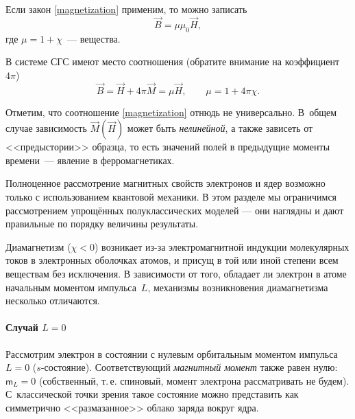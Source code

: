 Если закон \eqref{magnetization} применим,
то можно записать
\begin{equation}
    \vec{B} = \mu\mu_0 \vec{H},
\end{equation}
где $\mu = 1 + \chi$~---  вещества.
\begin{lab:note}
В системе СГС имеют место соотношения (обратите внимание на коэффициент
$4\pi$)
\[
\vec{B}=\vec{H}+4\pi\vec{M}=\mu\vec{H},\qquad \mu = 1 + 4\pi \chi.
\]
\end{lab:note}

Отметим, что соотношение \eqref{magnetization} отнюдь не универсально. 
В~общем случае зависимость $\vec{M}(\vec{H})$ может быть \emph{нелинейной}, 
а также зависеть от <<предыстории>> образца, то есть
значений полей в предыдущие моменты времени~---
явление  в ферромагнетиках.


Полноценное рассмотрение магнитных свойств электронов и ядер
возможно только с использованием квантовой механики. 
В этом разделе мы ограничимся рассмотрением
упрощённых полуклассических моделей --- они
наглядны и дают правильные по порядку величины результаты.

\label{sec:diamagnetism}

Диамагнетизм ($\chi <0$) возникает из-за электромагнитной индукции 
молекулярных токов в электронных оболочках атомов,
и присущ в той или иной степени всем веществам без исключения.
В зависимости от того, обладает ли электрон в атоме начальным моментом
импульса~$L$, механизмы возникновения диамагнетизма несколько
отличаются.

\paragraph{Случай $L=0$}
Рассмотрим электрон в состоянии с нулевым
орбитальным моментом импульса $L=0$ ($s$-состояние). Соответствующий \emph{магнитный
момент} также равен нулю: $\mathsf{m}_L = 0$ (собственный, т.\,е. спиновый,
момент электрона рассматривать не будем).
С~классической точки зрения такое состояние можно представить как симметрично
<<размазанное>> облако заряда вокруг ядра.

